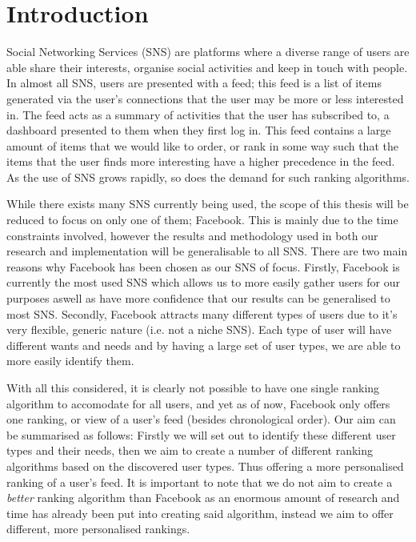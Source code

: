 \chapter{Introduction}\label{ch:intro}

Social Networking Services (SNS) are platforms where a diverse range of users are able share their interests, organise social activities and keep in touch with people. In almost all SNS, users are presented with a feed; this feed is a list of items generated via the user's connections that the user may be more or less interested in. The feed acts as a summary of activities that the user has subscribed to, a dashboard presented to them when they first log in. This feed contains a large amount of items that we would like to order, or rank in some way such that the items that the user finds more interesting have a higher precedence in the feed. As the use of SNS grows rapidly, so does the demand for such ranking algorithms. 

While there exists many SNS currently being used, the scope of this thesis will be reduced to focus on only one of them; Facebook. This is mainly due to the time constraints involved, however the results and methodology used in both our research and implementation will be generalisable to all SNS. There are two main reasons why Facebook has been chosen as our SNS of focus. 
Firstly, Facebook is currently the most used SNS which allows us to more easily gather users for our purposes aswell as have more confidence that our results can be generalised to most SNS. 
Secondly, Facebook attracts  many different types of users due to it's very flexible, generic nature (i.e. not a niche SNS). Each type of user will have different wants and needs and by having a large set of user types, we are able to more easily identify them. 

With all this considered, it is clearly not possible to have one single ranking algorithm  to accomodate for all users, and yet as of now, Facebook only offers one ranking, or view of a user's feed (besides chronological order). Our aim can be summarised as follows: Firstly we will set out to identify these different user types and their needs, then we aim to create a number of different ranking algorithms based on the discovered user types. Thus offering a more personalised ranking of a user's feed. It is important to note that we do not aim to create a \textit{better} ranking algorithm than Facebook as an enormous amount of research and time has already been put into creating said algorithm, instead we aim to offer different, more personalised rankings. 




